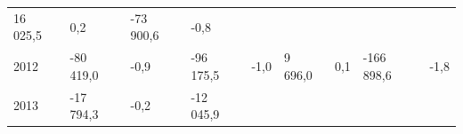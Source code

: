 \begin{longtable}[]{@{}lllllllll@{}}
\begin{minipage}[t]{0.12\columnwidth}
16 025,5\strut
\end{minipage} & \begin{minipage}[t]{0.06\columnwidth}\raggedright
0,2\strut
\end{minipage} & \begin{minipage}[t]{0.09\columnwidth}\raggedright
-73 900,6\strut
\end{minipage} & \begin{minipage}[t]{0.06\columnwidth}\raggedright
-0,8\strut
\end{minipage}\tabularnewline
\begin{minipage}[t]{0.05\columnwidth}\raggedright
2012\strut
\end{minipage} & \begin{minipage}[t]{0.10\columnwidth}\raggedright
-80 419,0\strut
\end{minipage} & \begin{minipage}[t]{0.06\columnwidth}\raggedright
-0,9\strut
\end{minipage} & \begin{minipage}[t]{0.16\columnwidth}\raggedright
-96 175,5\strut
\end{minipage} & \begin{minipage}[t]{0.06\columnwidth}\raggedright
-1,0\strut
\end{minipage} & \begin{minipage}[t]{0.12\columnwidth}\raggedright
9 696,0\strut
\end{minipage} & \begin{minipage}[t]{0.06\columnwidth}\raggedright
0,1\strut
\end{minipage} & \begin{minipage}[t]{0.09\columnwidth}\raggedright
-166 898,6\strut
\end{minipage} & \begin{minipage}[t]{0.06\columnwidth}\raggedright
-1,8\strut
\end{minipage}\tabularnewline
\begin{minipage}[t]{0.05\columnwidth}\raggedright
2013\strut
\end{minipage} & \begin{minipage}[t]{0.10\columnwidth}\raggedright
-17 794,3\strut
\end{minipage} & \begin{minipage}[t]{0.06\columnwidth}\raggedright
-0,2\strut
\end{minipage} & \begin{minipage}[t]{0.16\columnwidth}\raggedright
-12 045,9\strut

\end{minipage}
\end{longtable}
